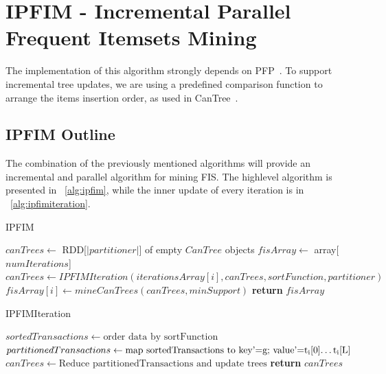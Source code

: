 \section{IPFIM - Incremental Parallel Frequent Itemsets Mining}
\label{sec:ipfim}
The implementation of this algorithm strongly depends on PFP~\cite{li2008pfp}. To support incremental tree updates, we are using a predefined comparison function to arrange the items insertion order, as used in CanTree~\cite{leung2005cantree}.

\subsection{IPFIM Outline}
The combination of the previously mentioned algorithms will provide an incremental and parallel algorithm for mining FIS.  The highlevel algorithm is presented in ~\ref{alg:ipfim}, while the inner update of every iteration is in ~\ref{alg:ipfimiteration}.

\begin{algorithm}
  \caption{IPFIM}
  \begin{algorithmic}[1]
   \label{alg:ipfim}
    \State $canTrees\gets$ RDD[$|partitioner|$] of empty $CanTree$ objects
    \State $fisArray\gets$ array[$numIterations$]
    	\State $canTrees \gets IPFIMIteration(iterationsArray[i],canTrees,sortFunction,partitioner)$
    	\State $fisArray[i] \gets mineCanTrees(canTrees,minSupport)$ 
    \EndFor
    \State \textbf{return} $fisArray$
    \EndProcedure
  \end{algorithmic}
\end{algorithm}

\begin{algorithm}
  \caption{IPFIMIteration}
  \begin{algorithmic}[1]
   \label{alg:ipfimiteration}
    \State $sortedTransactions\gets\text{order data by sortFunction}$
    \State $partitionedTransactions\gets\text{map sortedTransactions to key'=g; value'={t\textsubscript{i}[0]…t\textsubscript{i}[L]}}$ 
	\State $canTrees \gets\text{Reduce partitionedTransactions and update trees}$
	\State \textbf{return} $canTrees$
    \EndProcedure
  \end{algorithmic}
\end{algorithm}

